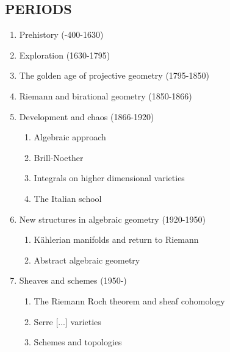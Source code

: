 \documentclass{article}
\begin{document}
\subsection{PERIODS}
\begin{enumerate}[label=\Roman*.]
\item Prehistory (-400-1630)
\item  Exploration (1630-1795)
\item  The golden age of projective geometry (1795-1850)
\item Riemann and birational geometry (1850-1866)
\item Development and chaos (1866-1920)
\begin{enumerate}[label=\alph*)]
\item Algebraic approach 
\item Brill-Noether
\item Integrals on higher dimensional varieties
\item The Italian school
\end{enumerate}

\item New structures in algebraic geometry (1920-1950)
\begin{enumerate}[label=\alph*)]
\item K\"ahlerian manifolds and return to Riemann
\item Abstract algebraic geometry
\end{enumerate}

\item Sheaves and schemes (1950-)
\begin{enumerate}[label=\alph*)]
\item The Riemann Roch theorem and sheaf cohomology
\item Serre [...] varieties
\item Schemes and topologies
\end{enumerate}
\end{enumerate}











\end{document}
